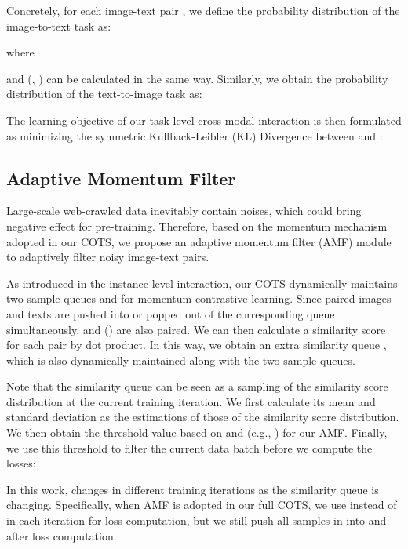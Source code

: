 \documentclass[10pt,twocolumn,letterpaper]{article}
\begin{document}
Concretely, for each image-text pair , we define the probability distribution of the image-to-text task as:

where

and  (, ) can be calculated in the same way. Similarly, we obtain the probability distribution of the text-to-image task as:

The learning objective of our task-level cross-modal interaction is then formulated as minimizing the symmetric Kullback-Leibler (KL) Divergence between  and :



\subsection{Adaptive Momentum Filter}

Large-scale web-crawled data inevitably contain noises, which could bring negative effect for pre-training. Therefore, based on the momentum mechanism adopted in our COTS, we propose an adaptive momentum filter (AMF) module to adaptively filter noisy image-text pairs.

As introduced in the instance-level interaction, our COTS dynamically maintains two sample queues  and  for momentum contrastive learning. Since paired images and texts are pushed into or popped out of the corresponding queue simultaneously,  and  () are also paired. We can then calculate a similarity score for each pair  by dot product. In this way, we obtain an extra similarity queue , which is also dynamically maintained along with the two sample queues.

Note that the similarity queue  can be seen as a sampling of the similarity score distribution at the current training iteration. We first calculate its mean  and standard deviation  as the estimations of those of the similarity score distribution. We then obtain the threshold value  based on  and  (e.g., ) for our AMF. Finally, we use this threshold to filter the current data batch  before we compute the losses:

In this work,  changes in different training iterations as the similarity queue is changing. Specifically, when AMF is adopted in our full COTS, we use  instead of  in each iteration for loss computation, but we still push all samples in  into  and  after loss computation.
\end{document}
